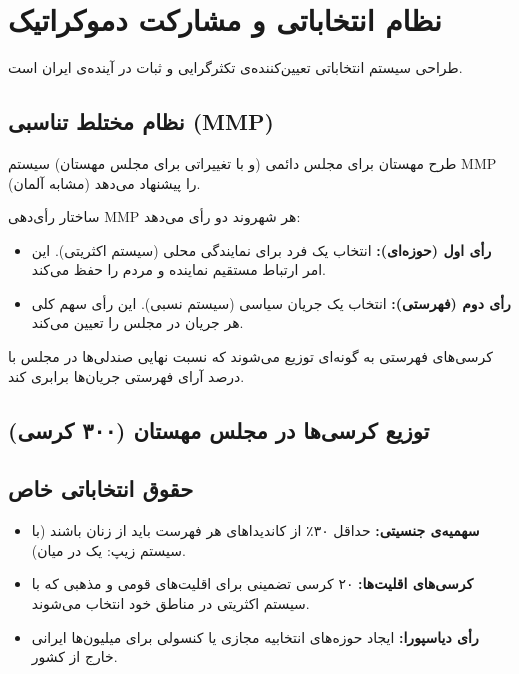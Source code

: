\chapter{نظام انتخاباتی و مشارکت دموکراتیک}
\label{app:elections}

طراحی سیستم انتخاباتی تعیین‌کننده‌ی تکثرگرایی و ثبات در آینده‌ی ایران است.

\section{نظام مختلط تناسبی (MMP)}

طرح مهستان برای مجلس دائمی (و با تغییراتی برای مجلس مهستان) سیستم MMP (مشابه آلمان) را پیشنهاد می‌دهد.

\begin{modernbox}{ساختار رأی‌دهی MMP}
هر شهروند دو رأی می‌دهد:
\begin{itemize}
    \item \textbf{رأی اول (حوزه‌ای):} انتخاب یک فرد برای نمایندگی محلی (سیستم اکثریتی). این امر ارتباط مستقیم نماینده و مردم را حفظ می‌کند.
    \item \textbf{رأی دوم (فهرستی):} انتخاب یک جریان سیاسی (سیستم نسبی). این رأی سهم کلی هر جریان در مجلس را تعیین می‌کند.
\end{itemize}
کرسی‌های فهرستی به گونه‌ای توزیع می‌شوند که نسبت نهایی صندلی‌ها در مجلس با درصد آرای فهرستی جریان‌ها برابری کند.
\end{modernbox}

\section{توزیع کرسی‌ها در مجلس مهستان (۳۰۰ کرسی)}

\begin{center}
\end{center}

\section{حقوق انتخاباتی خاص}

\begin{itemize}
    \item \textbf{سهمیه‌ی جنسیتی:} حداقل ۳۰٪ از کاندیداهای هر فهرست باید از زنان باشند (با سیستم زیپ: یک در میان).
    \item \textbf{کرسی‌های اقلیت‌ها:} ۲۰ کرسی تضمینی برای اقلیت‌های قومی و مذهبی که با سیستم اکثریتی در مناطق خود انتخاب می‌شوند.
    \item \textbf{رأی دیاسپورا:} ایجاد حوزه‌های انتخابیه مجازی یا کنسولی برای میلیون‌ها ایرانی خارج از کشور.
\end{itemize}

